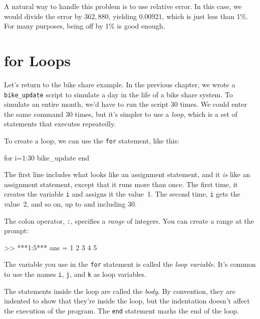 A natural way to handle this problem is to use relative
error.
In this case, we would divide the error
by $362,880$, yielding $0.00921$, which is just less than 1\%.
For many purposes, being off by 1\% is good enough.


\section{for Loops}


Let's return to the bike share example. 
In the previous chapter, we wrote a \lstinline{bike_update} script to simulate a
day in the life of a bike share system. To simulate an entire
month, we'd have to run the script 30 times. We could enter the same command 30 times, but it's simpler to use a \emph{loop}, which is a set of statements that executes repeatedly.

To create a loop, we can use the \lstinline{for} statement, like this:

\begin{code}
for i=1:30
    bike_update
end
\end{code}

The first line includes what looks like an assignment statement, and it {\em is}
like an assignment statement, except that it runs more than once.  The
first time, it creates the variable \lstinline{i} and assigns it the
value~1.  The second time, \lstinline{i} gets the value~2, and so on, up to
and including 30.


The colon operator, \lstinline{:}, specifies a {\em range} of integers.
You can create a range at the prompt:

\begin{code}
>> ***1:5***
ans =  1     2     3     4     5
\end{code}

The variable you use in the \lstinline{for} statement is called the \emph{loop
variable}.  It's common to use the names \lstinline{i},
\lstinline{j}, and \lstinline{k} as loop variables.


The statements inside the loop are called the \emph{body}.  By convention,
they are indented to show that they're inside the loop, but the
indentation doesn't affect the execution of the program.
The \lstinline{end} statement marks the end of the loop.


